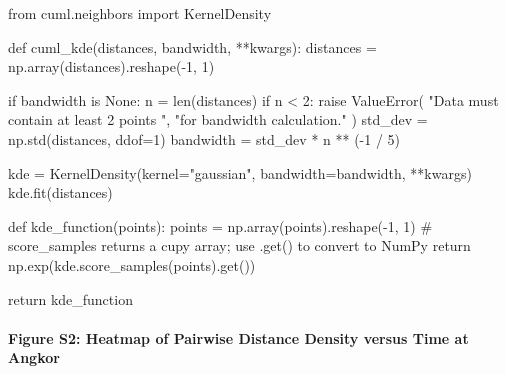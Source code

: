 \documentclass[
  11pt,
  letterpaper,
  DIV=11,
  numbers=noendperiod]{scrartcl}
\let\oldparagraph\paragraph
\renewcommand{\paragraph}[1]{\oldparagraph{#1}\mbox{}}
\newenvironment{Shaded}{\begin{snugshade}}{\end{snugshade}}
\newcommand{\BuiltInTok}[1]{\textcolor[rgb]{0.00,0.23,0.31}{#1}}
\newcommand{\CommentTok}[1]{\textcolor[rgb]{0.37,0.37,0.37}{#1}}
\newcommand{\ControlFlowTok}[1]{\textcolor[rgb]{0.00,0.23,0.31}{#1}}
\newcommand{\DecValTok}[1]{\textcolor[rgb]{0.68,0.00,0.00}{#1}}
\newcommand{\ImportTok}[1]{\textcolor[rgb]{0.00,0.46,0.62}{#1}}
\newcommand{\KeywordTok}[1]{\textcolor[rgb]{0.00,0.23,0.31}{#1}}
\newcommand{\NormalTok}[1]{\textcolor[rgb]{0.00,0.23,0.31}{#1}}
\newcommand{\OperatorTok}[1]{\textcolor[rgb]{0.37,0.37,0.37}{#1}}
\newcommand{\PreprocessorTok}[1]{\textcolor[rgb]{0.68,0.00,0.00}{#1}}
\newcommand{\StringTok}[1]{\textcolor[rgb]{0.13,0.47,0.30}{#1}}
\newcommand{\VariableTok}[1]{\textcolor[rgb]{0.07,0.07,0.07}{#1}}
\begin{document}
\begin{Shaded}
\begin{Highlighting}[]
\ImportTok{from}\NormalTok{ cuml.neighbors }\ImportTok{import}\NormalTok{ KernelDensity}

\KeywordTok{def}\NormalTok{ cuml\_kde(distances, bandwidth, }\OperatorTok{**}\NormalTok{kwargs):}
\NormalTok{    distances }\OperatorTok{=}\NormalTok{ np.array(distances).reshape(}\OperatorTok{{-}}\DecValTok{1}\NormalTok{, }\DecValTok{1}\NormalTok{)}

    \ControlFlowTok{if}\NormalTok{ bandwidth }\KeywordTok{is} \VariableTok{None}\NormalTok{:}
\NormalTok{        n }\OperatorTok{=} \BuiltInTok{len}\NormalTok{(distances)}
        \ControlFlowTok{if}\NormalTok{ n }\OperatorTok{\textless{}} \DecValTok{2}\NormalTok{:}
            \ControlFlowTok{raise} \PreprocessorTok{ValueError}\NormalTok{(}
                \StringTok{"Data must contain at least 2 points "}\NormalTok{, }
                \StringTok{"for bandwidth calculation."}
\NormalTok{            )}
\NormalTok{        std\_dev }\OperatorTok{=}\NormalTok{ np.std(distances, ddof}\OperatorTok{=}\DecValTok{1}\NormalTok{)}
\NormalTok{        bandwidth }\OperatorTok{=}\NormalTok{ std\_dev }\OperatorTok{*}\NormalTok{ n }\OperatorTok{**}\NormalTok{ (}\OperatorTok{{-}}\DecValTok{1} \OperatorTok{/} \DecValTok{5}\NormalTok{)}
    
\NormalTok{    kde }\OperatorTok{=}\NormalTok{ KernelDensity(kernel}\OperatorTok{=}\StringTok{"gaussian"}\NormalTok{, bandwidth}\OperatorTok{=}\NormalTok{bandwidth, }\OperatorTok{**}\NormalTok{kwargs)}
\NormalTok{    kde.fit(distances)}

    \KeywordTok{def}\NormalTok{ kde\_function(points):}
\NormalTok{        points }\OperatorTok{=}\NormalTok{ np.array(points).reshape(}\OperatorTok{{-}}\DecValTok{1}\NormalTok{, }\DecValTok{1}\NormalTok{)}
        \CommentTok{\# score\_samples returns a cupy array; use .get() to convert to NumPy}
        \ControlFlowTok{return}\NormalTok{ np.exp(kde.score\_samples(points).get())}
    
    \ControlFlowTok{return}\NormalTok{ kde\_function}
\end{Highlighting}
\end{Shaded}

\paragraph{Figure S2: Heatmap of Pairwise Distance Density versus Time
at
Angkor}\label{figure-s2-heatmap-of-pairwise-distance-density-versus-time-at-angkor}
\end{document}
